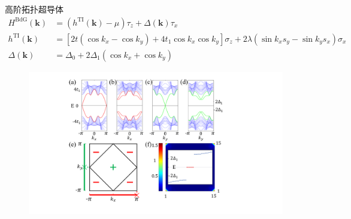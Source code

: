 \documentclass[10pt,aspectratio=169]{beamer} %
\begin{document}
\begin{frame}{高阶拓扑超导体}
\begin{equation}
\begin{aligned}
H^{\mathrm{BdG}}(\mathbf{k})&=(h^{\mathrm{TI}}(\mathbf{k})-\mu)\tau_z+\Delta(\mathbf{k})\tau_x\\
h^{\mathrm{TI}}(\mathbf{k})&=\left[2t(\cos k_x-\cos k_y)+4t_1\cos k_x\cos k_y\right]\sigma_z+2\lambda(\sin k_xs_y-\sin k_ys_x)\sigma_x\\
\Delta(\mathbf{k})&=\Delta_0+2\Delta_1(\cos k_x+\cos k_y)\label{hosc2}
\end{aligned}
\end{equation}
\begin{figure}[h]
\centering
\includegraphics[scale=0.3]{pic/fig13}\label{fig12}
\end{figure}
\end{frame}
\end{document}
